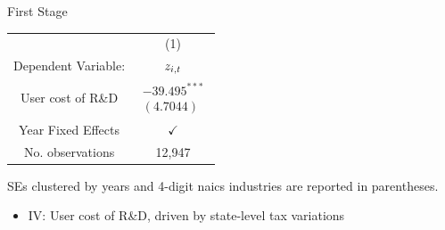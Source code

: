 \documentclass[
  aspectratio=169,  %
  handout           %
]{beamer}
\theoremstyle{plain}
\begin{document}
\begin{frame}{First Stage \hyperlink{regression}{}}
  \begin{center}

    \begin{tabular}{cc}
      \hline
      \hline              & (1)\tabularnewline
      Dependent Variable: & $\text{\ensuremath{z_{i,t}}}$\tabularnewline
      \hline
      User cost of R\&D   & $\begin{array}{c}
                                 -39.495^{***} \\
                                 (4.7044)
                               \end{array}$\tabularnewline
      \hline
      Year Fixed Effects  & $\checkmark$\tabularnewline
      No. observations    & 12,947\tabularnewline
      \hline
    \end{tabular}\medskip{}
    \par\end{center}

  {\footnotesize 
  SEs clustered by years and 4-digit naics industries are reported in parentheses.
  }
  \medskip{}
  \begin{itemize}
    \item IV: User cost of R\&D, driven by state-level tax variations \citep{Wilson2009-ri,Bloom2013-pn}
  \end{itemize}

\end{frame}
\end{document}
